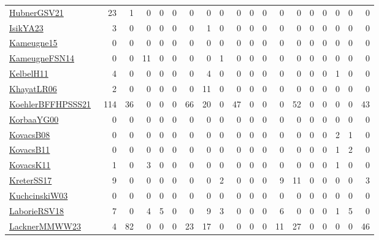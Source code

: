 {\begin{longtable}{l*{18}{r}}
\href{articles/HubnerGSV21.pdf}{HubnerGSV21}~\cite{HubnerGSV21} & 23 & 1 & 0 & 0 & 0 & 0 & 0 & 0 & 0 & 0 & 0 & 0 & 0 & 0 & 0 & 0 & 0 & 0\\
\href{articles/IsikYA23.pdf}{IsikYA23}~\cite{IsikYA23} & 3 & 0 & 0 & 0 & 0 & 0 & 1 & 0 & 0 & 0 & 0 & 0 & 0 & 0 & 0 & 0 & 0 & 0\\
\href{articles/Kameugne15.pdf}{Kameugne15}~\cite{Kameugne15} & 0 & 0 & 0 & 0 & 0 & 0 & 0 & 0 & 0 & 0 & 0 & 0 & 0 & 0 & 0 & 0 & 0 & 0\\
\href{articles/KameugneFSN14.pdf}{KameugneFSN14}~\cite{KameugneFSN14} & 0 & 0 & 11 & 0 & 0 & 0 & 0 & 1 & 0 & 0 & 0 & 0 & 0 & 0 & 0 & 0 & 0 & 0\\
\href{articles/KelbelH11.pdf}{KelbelH11}~\cite{KelbelH11} & 4 & 0 & 0 & 0 & 0 & 0 & 4 & 0 & 0 & 0 & 0 & 0 & 0 & 0 & 0 & 1 & 0 & 0\\
\href{articles/KhayatLR06.pdf}{KhayatLR06}~\cite{KhayatLR06} & 2 & 0 & 0 & 0 & 0 & 0 & 11 & 0 & 0 & 0 & 0 & 0 & 0 & 0 & 0 & 0 & 0 & 0\\
\href{articles/KoehlerBFFHPSSS21.pdf}{KoehlerBFFHPSSS21}~\cite{KoehlerBFFHPSSS21} & 114 & 36 & 0 & 0 & 0 & 66 & 20 & 0 & 47 & 0 & 0 & 0 & 52 & 0 & 0 & 0 & 0 & 43\\
\href{articles/KorbaaYG00.pdf}{KorbaaYG00}~\cite{KorbaaYG00} & 0 & 0 & 0 & 0 & 0 & 0 & 0 & 0 & 0 & 0 & 0 & 0 & 0 & 0 & 0 & 0 & 0 & 0\\
\href{articles/KovacsB08.pdf}{KovacsB08}~\cite{KovacsB08} & 0 & 0 & 0 & 0 & 0 & 0 & 0 & 0 & 0 & 0 & 0 & 0 & 0 & 0 & 0 & 2 & 1 & 0\\
\href{articles/KovacsB11.pdf}{KovacsB11}~\cite{KovacsB11} & 0 & 0 & 0 & 0 & 0 & 0 & 0 & 0 & 0 & 0 & 0 & 0 & 0 & 0 & 0 & 1 & 2 & 0\\
\href{articles/KovacsK11.pdf}{KovacsK11}~\cite{KovacsK11} & 1 & 0 & 3 & 0 & 0 & 0 & 0 & 0 & 0 & 0 & 0 & 0 & 0 & 0 & 0 & 1 & 0 & 0\\
\href{articles/KreterSS17.pdf}{KreterSS17}~\cite{KreterSS17} & 9 & 0 & 0 & 0 & 0 & 0 & 0 & 2 & 0 & 0 & 0 & 9 & 11 & 0 & 0 & 0 & 0 & 3\\
\href{articles/KuchcinskiW03.pdf}{KuchcinskiW03}~\cite{KuchcinskiW03} & 0 & 0 & 0 & 0 & 0 & 0 & 0 & 0 & 0 & 0 & 0 & 0 & 0 & 0 & 0 & 0 & 0 & 0\\
\href{articles/LaborieRSV18.pdf}{LaborieRSV18}~\cite{LaborieRSV18} & 7 & 0 & 4 & 5 & 0 & 0 & 9 & 3 & 0 & 0 & 0 & 6 & 0 & 0 & 0 & 1 & 5 & 0\\
\href{articles/LacknerMMWW23.pdf}{LacknerMMWW23}~\cite{LacknerMMWW23} & 4 & 82 & 0 & 0 & 0 & 23 & 17 & 0 & 0 & 0 & 0 & 11 & 27 & 0 & 0 & 0 & 0 & 46\\

\end{longtable}}
